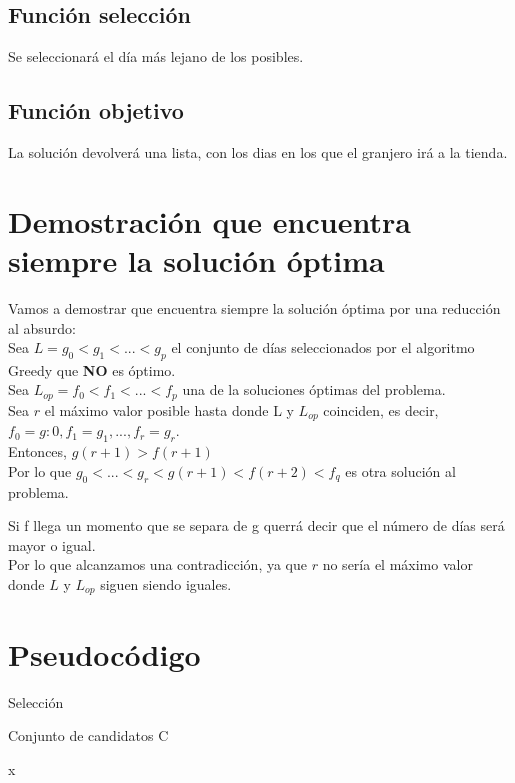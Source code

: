 \subsection{Función selección}
Se seleccionará el día más lejano de los posibles.

\subsection{Función objetivo}
La solución devolverá una lista, con los dias en los que el granjero irá a  la tienda.


\section{Demostración que encuentra siempre la solución óptima}

Vamos a demostrar que encuentra siempre la solución óptima por una reducción al absurdo:\\

Sea $ L = g_0 < g_1 < ... < g_p $ el conjunto de días seleccionados por el algoritmo Greedy que \textbf{NO} es óptimo.\\

Sea $ L_{op} = f_0 < f_1 < ... < f_p $ una de la soluciones óptimas del problema.\\

Sea $r$ el máximo valor posible hasta donde L y $L_{op}$ coinciden, es decir, $f_0=g:0, f_1=g_1,...,f_r = g_r$.\\
Entonces, $g(r+1) > f(r+1)$ \\
Por lo que $g_0 < ... < g_r < g(r+1) < f(r+2) < f_q $ es otra solución al problema. 

Si f llega un momento que se separa de g querrá decir que el número de días será mayor o igual.\\
Por lo que alcanzamos una contradicción, ya que $r$  no sería el máximo valor donde $L$ y $L_{op}$ siguen siendo iguales.


\section{Pseudocódigo}

	Selección
	
	\begin{algorithmic}
		\Require Conjunto de candidatos C
		\EndIf
		\EndFor  
		
		\Return x	
	\end{algorithmic}	



